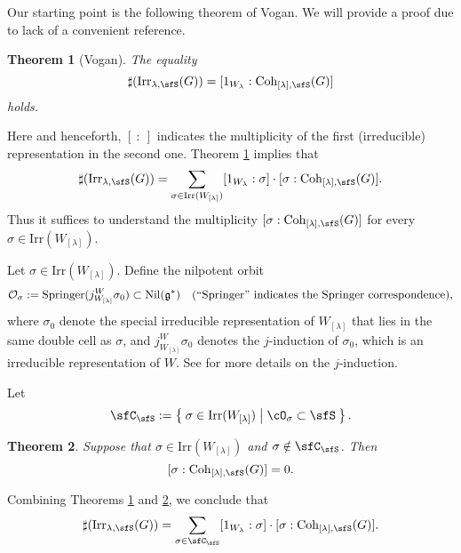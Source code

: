 \documentclass[12pt,a4paper]{amsart}
\newcommand{\CO}{{\mathcal {O}}}
\newcommand{\g}{\mathfrak g}
\newcommand{\be}{\begin {equation}}
\newcommand{\ee}{\end {equation}}
\numberwithin{equation}{section}
\newtheorem{thm}{Theorem}[section]
\theoremstyle{remark}
\def\Irr{\mathrm{Irr}}
\def\WLam{W_{\Lam}}
\def\Coh{\mathrm{Coh}}
\providecommand{\nsubset}{\not\subset}
\newcommand{\Lam}{{[\lambda]}}
\begin{document}
Our starting point is the following theorem of Vogan. We will provide a proof due to lack of a convenient reference.
\begin{thm}[Vogan]\label{count1}
  The equality
  \[
    \sharp(\Irr_{\lambda,\sfS}(G)) = [1_{W_{\lambda}}:\Coh_{\Lam,\sfS}(G)]
  \]
  holds.
\end{thm}
Here and henceforth, $[\ : \ ]$ indicates the multiplicity of the first
(irreducible) representation in the second one. Theorem \ref{count1} implies
that
\begin{equation}\label{countlg}
  \sharp(\Irr_{\lambda,\sfS}(G)) = \sum_{\sigma\in \Irr(W_\Lam)} [1_{W_{\lambda}}: \sigma]\cdot [\sigma: \Coh_{\Lam,\sfS}(G)].
\end{equation}
Thus it suffices to understand the multiplicity $ [\sigma: \Coh_{\Lam,\sfS}(G)]$
for every $\sigma\in \Irr(W_\Lam)$.

Let $\sigma\in \Irr(W_\Lam)$. Define the
nilpotent orbit
\[
  \CO_\sigma:=\mathrm{Springer}(j_{W_\Lam}^W \sigma_0)\subset \mathrm{Nil}(\g^*) \quad (``\mathrm{Springer}"\textrm{
    indicates the Springer correspondence}),
\]
where $\sigma_0$ denote the special irreducible representation of $W_\Lam$ that
lies in the same double cell as $\sigma$, and $j_{W_\Lam}^W \sigma_0$ denotes
the $j$-induction of $\sigma _0$, which is an irreducible representation of $W$. See \cite[Chapter 11]{Carter} for more details on the $j$-induction.


Let
\be\label{sfc}
  \sfC_{\sfS}:= \Set{\sigma\in \Irr(\WLam)| \cO_{\sigma}\subset \sfS}.
\ee

\begin{thm}\label{count2}
  Suppose that $\sigma\in \Irr(W_\Lam)$ and $\sigma \notin \sfC_{\sfS}$. Then
  \[
    [\sigma: \Coh_{\Lam,\sfS}(G)]=0.
  \]

\end{thm}


Combining Theorems \ref{count1} and \ref{count2}, we conclude that
\begin{equation}\label{leq2}
  \sharp(\Irr_{\lambda,\sfS}(G)) = \sum_{\sigma \in \sfC_{\sfS}} [1_{W_{\lambda}}: \sigma]\cdot [\sigma: \Coh_{\Lam,\sfS}(G)].
\end{equation}



\end{document}
